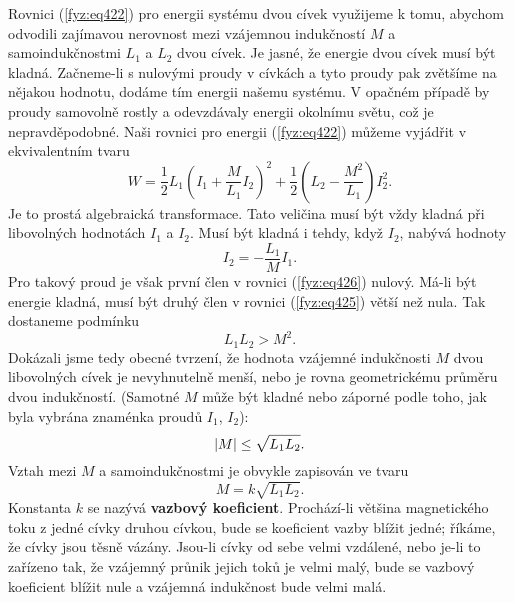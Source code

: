   Rovnici (\ref{fyz:eq422}) pro energii systému dvou cívek využijeme k tomu, abychom odvodili 
  zajímavou nerovnost mezi vzájemnou indukčností \(M\) a samoindukčnostmi \(L_1\) a \(L_2\) dvou 
  cívek. Je jasné, že energie dvou cívek musí být kladná. Začneme-li s nulovými proudy v cívkách a 
  tyto proudy pak zvětšíme na nějakou hodnotu, dodáme tím energii našemu systému. V opačném případě 
  by proudy samovolně rostly a odevzdávaly energii okolnímu světu, což je nepravděpodobné. Naši 
  rovnici pro energii (\ref{fyz:eq422}) můžeme vyjádřit v ekvivalentním tvaru
  \begin{equation}\label{fyz:eq425}
    W = \frac{1}{2}L_1\left(I_1+\frac{M}{L_1}I_2\right)^2 + 
        \frac{1}{2}\left(L_2-\frac{M^2}{L_1}\right)I_2^2.
  \end{equation}
  Je to prostá algebraická transformace. Tato veličina musí být vždy kladná při libovolných 
  hodnotách \(I_1\) a \(I_2\). Musí být kladná i tehdy, když \(I_2\), nabývá hodnoty
  \begin{equation}\label{fyz:eq426}
    I_2 = - \frac{L_1}{M}I_1.
  \end{equation}
  Pro takový proud je však první člen v rovnici (\ref{fyz:eq426}) nulový. Má-li být energie kladná, 
  musí být druhý člen v rovnici (\ref{fyz:eq425}) větší než nula. Tak dostaneme podmínku
  \begin{equation}\label{fyz:eq427}
    L_1L_2 >M^2.
  \end{equation}
  Dokázali jsme tedy obecné tvrzení, že hodnota vzájemné indukčnosti \(M\) dvou libovolných cívek
  je nevyhnutelně menší, nebo je rovna geometrickému průměru dvou indukčností. (Samotné \(M\) může 
  být kladné nebo záporné podle toho, jak byla vybrána znaménka proudů \(I_1\), \(I_2\)):
  \begin{equation}\label{fyz:eq428}
    \left\lvert M\right\rvert\leq \sqrt{L_1L_2}.
  \end{equation}
  Vztah mezi \(M\) a samoindukčnostmi je obvykle zapisován ve tvaru
  \begin{equation}\label{fyz:eq429}
    M =  k\sqrt{L_1L_2}.
  \end{equation}
  Konstanta \(k\) se nazývá \textbf{vazbový koeficient}. Prochází-li většina magnetického toku z 
  jedné cívky druhou cívkou, bude se koeficient vazby blížit jedné; říkáme, že cívky jsou těsně 
  vázány. Jsou-li cívky od sebe velmi vzdálené, nebo je-li to zařízeno tak, že vzájemný průnik 
  jejich toků je velmi malý, bude se vazbový koeficient blížit nule a vzájemná indukčnost bude 
  velmi malá. 
  

